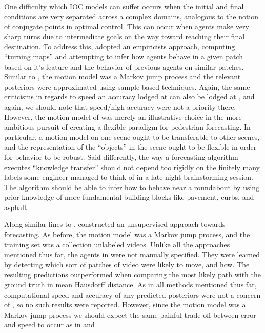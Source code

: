 \documentclass[conference]{IEEEtran}
\begin{document}
One difficulty which IOC models can suffer occurs when the initial and final conditions are very separated across a complex domains, analogous to the notion of conjugate points in optimal control.
This can occur when agents make very sharp turns due to intermediate goals on the way toward reaching their final destination.
To address this, \citet{Ballan2016} adopted an empiricists approach, computing ``turning maps'' and attempting to infer how agents behave in a given patch based on it's feature and the behavior of previous agents on similar patches.
Similar to \cite{Karasev2016}, the motion model was a Markov jump process and the relevant posteriors were approximated using sample based techniques.
Again, the same criticisms in regards to speed an accuracy lodged at \cite{Karasev2016} can also be lodged at \cite{Ballan2016}, and again, we should note that speed/high accuracy were not a priority there.
However, the motion model of \citet{Ballan2016} was merely an illustrative choice in the more ambitious pursuit of creating a flexible paradigm for pedestrian forecasting.
In particular, a motion model on one scene ought to be transferable to other scenes, and the representation of the ``objects'' in the scene ought to be flexible in order for behavior to be robust.
Said differently, the way a forecasting algorithm executes ``knowledge transfer'' should not depend too rigidly on the finitely many labels some engineer managed to think of in a late-night brainstorming session.
The algorithm should be able to infer how to behave near a roundabout by using prior knowledge of more fundamental building blocks like pavement, curbs, and asphalt.

Along similar lines to \cite{Ballan2016}, \citet{Walker2014} constructed an unsupervised approach towards forecasting.
As before, the motion model was a Markov jump process, and the training set was a collection unlabeled videos.
Unlike all the approaches mentioned thus far, the agents in \cite{Walker2014} were not manually specified.
They were learned by detecting which sort of patches of video were likely to move, and how.
The resulting predictions outperformed \cite{Kitani2012} when comparing the most likely path with the ground truth in mean Hausdorff distance.
As in all methods mentioned thus far, computational speed and accuracy of any predicted posteriors were not a concern of \citet{Walker2014}, so no such results were reported.
However, since the motion model was a Markov jump process we should expect the same painful trade-off between error and speed to occur as in \cite{Karasev2016} and \cite{Ballan2016}.
\end{document}
